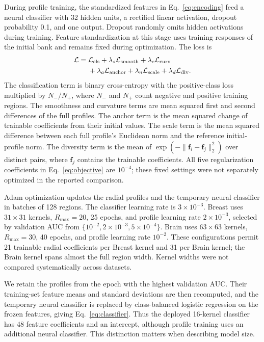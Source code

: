 \documentclass[10pt,twocolumn]{article}
\begin{document}
During profile training, the standardized features in Eq.~\eqref{eq:encoding} feed a neural classifier with 32 hidden units, a rectified linear activation, dropout probability 0.1, and one output. Dropout randomly omits hidden activations during training. Feature standardization at this stage uses training responses of the initial bank and remains fixed during optimization. The loss is
\begin{equation}
\begin{aligned}
\mathcal L={}&\mathcal L_{\rm cls}+\lambda_s\mathcal L_{\rm smooth}
+\lambda_c\mathcal L_{\rm curv}\\
&+\lambda_a\mathcal L_{\rm anchor}+\lambda_n\mathcal L_{\rm scale}
+\lambda_d\mathcal L_{\rm div}.
\end{aligned}
\label{eq:objective}
\end{equation}
The classification term is binary cross-entropy with the positive-class loss multiplied by $N_-/N_+$, where $N_-$ and $N_+$ count negative and positive training regions. The smoothness and curvature terms are mean squared first and second differences of the full profiles. The anchor term is the mean squared change of trainable coefficients from their initial values. The scale term is the mean squared difference between each full profile's Euclidean norm and the reference initial-profile norm. The diversity term is the mean of $\exp(-\|\mathbf f_i-\mathbf f_j\|_2^2)$ over distinct pairs, where $\mathbf f_j$ contains the trainable coefficients. All five regularization coefficients in Eq.~\eqref{eq:objective} are $10^{-4}$; these fixed settings were not separately optimized in the reported comparison.

Adam optimization updates the radial profiles and the temporary neural classifier in batches of 128 regions. The classifier learning rate is $3\times10^{-3}$. Breast uses $31\times31$ kernels, $R_{\max}=20$, 25 epochs, and profile learning rate $2\times10^{-3}$, selected by validation AUC from $\{10^{-2},2\times10^{-3},5\times10^{-4}\}$. Brain uses $63\times63$ kernels, $R_{\max}=30$, 40 epochs, and profile learning rate $10^{-2}$. These configurations permit 21 trainable radial coefficients per Breast kernel and 31 per Brain kernel; the Brain kernel spans almost the full region width. Kernel widths were not compared systematically across datasets.

We retain the profiles from the epoch with the highest validation AUC. Their training-set feature means and standard deviations are then recomputed, and the temporary neural classifier is replaced by class-balanced logistic regression on the frozen features, giving Eq.~\eqref{eq:classifier}. Thus the deployed 16-kernel classifier has 48 feature coefficients and an intercept, although profile training uses an additional neural classifier. This distinction matters when describing model size.
\end{document}
